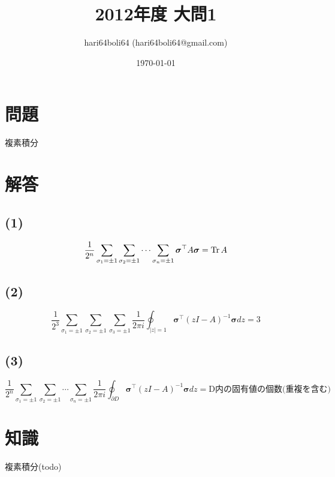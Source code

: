 \documentclass[a4paper, 10pt, dvipdfmx]{jlreq}
\begin{document}
\title{2012年度 大問1}
\author{hari64boli64 (hari64boli64@gmail.com)}
\date{\today}
\maketitle

\section{問題}

複素積分

\section{解答}

\subsection*{(1)}

\begin{equation*}
  \frac{1}{2^n}\sum_{\sigma_1=\pm1}\sum_{\sigma_2=\pm1}\cdots\sum_{\sigma_n=\pm1}\bm{\sigma}^\top A\bm{\sigma}=\Tr A
\end{equation*}

\subsection*{(2)}

\begin{equation*}
  \frac{1}{2^3}\sum_{\sigma_1=\pm1}\sum_{\sigma_2=\pm1}\sum_{\sigma_3=\pm1}\frac{1}{2 \pi i}\oint_{|z|=1}\bm{\sigma}^\top (zI-A)^{-1}\bm{\sigma}dz=3
\end{equation*}

\subsection*{(3)}

\begin{equation*}
  \frac{1}{2^n}\sum_{\sigma_1=\pm1}\sum_{\sigma_2=\pm1}\cdots\sum_{\sigma_n=\pm1}\frac{1}{2 \pi i}\oint_{\partial D}\bm{\sigma}^\top (zI-A)^{-1}\bm{\sigma}dz=\text{D内の固有値の個数(重複を含む)}
\end{equation*}

\section{知識}

複素積分(todo)


\end{document}
